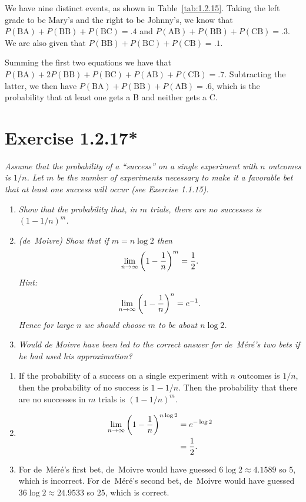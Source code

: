\documentclass{tufte-handout}
\begin{document}
We have nine distinct events, as shown in
Table~\ref{tab:1.2.15}. Taking the left grade to be Mary's and the
right to be Johnny's, we know that $P(\textrm{BA}) + P(\textrm{BB}) +
P(\textrm{BC}) = .4$ and $P(\textrm{AB}) + P(\textrm{BB}) +
P(\textrm{CB}) = .3$. We are also given that $P(\textrm{BB}) +
P(\textrm{BC}) + P(\textrm{CB}) = .1$.

Summing the first two equations we have that
$P(\textrm{BA}) + 2P(\textrm{BB}) + P(\textrm{BC}) + P(\textrm{AB}) +
P(\textrm{CB}) = .7$.
Subtracting the latter, we then have
$P(\textrm{BA}) + P(\textrm{BB}) + P(\textrm{AB}) = .6$, which is the
probability that at least one gets a B and neither gets a C.

\section{Exercise 1.2.17*}

\emph{Assume that the probability of a ``success'' on a single
  experiment with $n$ outcomes is $1/n$. Let $m$ be the number of
  experiments necessary to make it a favorable bet that at least one
  success will occur (see Exercise 1.1.15).}
\begin{enumerate}[label=(\emph{\alph*})]
  \item \emph{Show that the probability that, in $m$ trials, there are
    no successes is $(1 - 1/n)^m$.}
  \item \emph{(de~Moivre) Show that if $m = n \log 2$ then
    \[ 
    \lim_{n \rightarrow \infty} {\left( 1 - {1 \over n} \right)}^m = {1
    \over 2}.
    \]
    Hint:
    \[
    \lim_{n \rightarrow \infty} {\left( 1 - {1 \over n} \right)}^n = e^{-1}.
    \]
    Hence for large $n$ we should choose $m$ to be about $n \log 2$.}
  \item \emph{Would de Moivre have been led to the correct answer for
    de~M\'er\'e's two bets if he had used his approximation?}
\end{enumerate}

\bigskip

\begin{enumerate}[label=(\alph*)]
\item If the probability of a success on a single experiment with $n$
  outcomes is $1/n$, then the probability of no success is $1 -
  1/n$. Then the probability that there are no successes in $m$ trials
  is ${(1 - 1/n)}^m$.
\item
  \begin{align*}
    \lim_{n \rightarrow \infty} {\left( 1 - {1 \over n}\right)}^{n
    \log 2} &= e^{ -\log 2} \\
            &= {1 \over 2}.
  \end{align*}
\item For de~M\'er\'e's first bet, de~Moivre would have guessed $6
  \log 2 \approx 4.1589$ so $5$, which is incorrect. For de~M\'er\'e's
  second bet, de~Moivre would have guessed $36 \log 2 \approx 24.9533$
  so $25$, which is correct.
\end{enumerate}
\end{document}
